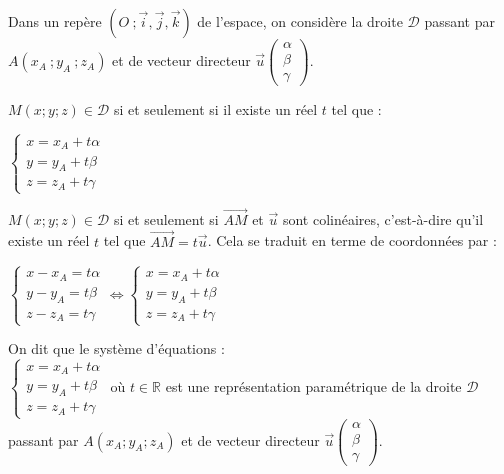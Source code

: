 \documentclass{cornouaille}
\begin{document}
\begin{propriete}
  Dans un repère $(O\ ;\vec{i},\vec{j},\vec{k})$ de l'espace, on
  considère la droite $\mathscr{D}$ passant par $A(x_A\ ;y_A\ ;z_A)$
  et de vecteur directeur
  $\vec{u} \begin {pmatrix} \alpha\\\beta\\\gamma \end{pmatrix}$.

  $M(x;y;z)\in \mathscr{D}$ si et seulement si il existe un réel $t$
  tel que :
  \begin{center}
    $\begin{cases}x=x_A+t\alpha \\y=y_A+t\beta
      \\z=z_A+t\gamma \end{cases}$
  \end{center}
\end{propriete}

\begin{preuve}
  $M(x;y;z)\in \mathscr{D}$ si et seulement si $\overrightarrow{AM}$
  et $\vec{u}$ sont colinéaires, c'est-à-dire qu'il existe un réel $t$
  tel que $\overrightarrow{AM}=t\overrightarrow{u}$.  Cela se traduit
  en terme de coordonnées par :

  $\begin{cases}x-x_A=t\alpha \\y-y_A=t\beta
    \\z-z_A=t\gamma \end{cases}\Leftrightarrow\begin{cases}x=x_A+t\alpha
    \\y=y_A+t\beta \\z=z_A+t\gamma \end{cases}$
\end{preuve}

\begin{definition}
  On dit que le système d'équations : \\
  $\begin{cases}
    x=x_A+t\alpha    \\
    y=y_A+t\beta \\
    z=z_A+t\gamma 
  \end{cases}$
  où $t\in\mathbb{R}$ est une représentation
    paramétrique de la droite $\mathscr{D}$ passant par
  $A(x_A;y_A;z_A)$ et de vecteur directeur $\vec{u}
  \begin {pmatrix} 
    \alpha\\
    \beta\\
    \gamma 
  \end{pmatrix}$.
\end{definition}
\end{document}
